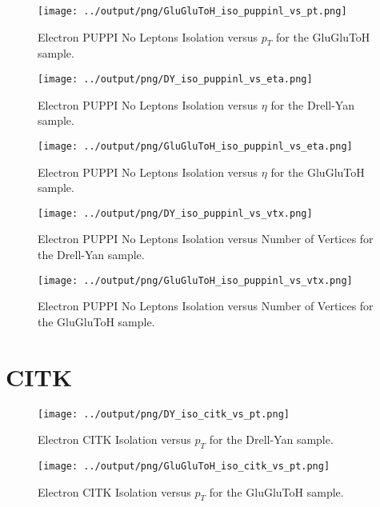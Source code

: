 \documentclass[11pt]{book}
\begin{document}
\begin{figure}[htb]
\centering
\texttt{[image: ../output/png/GluGluToH\_iso\_puppinl\_vs\_pt.png]}
\caption{Electron PUPPI No Leptons Isolation versus $p_{T}$ for the GluGluToH sample.}
\label{fig:ggh_iso_puppinl_vs_pt}
\end{figure}

\begin{figure}[htb]
\centering
\texttt{[image: ../output/png/DY\_iso\_puppinl\_vs\_eta.png]}
\caption{Electron PUPPI No Leptons Isolation versus $\eta$ for the Drell-Yan sample.}
\label{fig:dy_iso_puppinl_vs_eta}
\end{figure}

\begin{figure}[htb]
\centering
\texttt{[image: ../output/png/GluGluToH\_iso\_puppinl\_vs\_eta.png]}
\caption{Electron PUPPI No Leptons Isolation versus $\eta$ for the GluGluToH sample.}
\label{fig:ggh_iso_puppinl_vs_eta}
\end{figure}

\begin{figure}[htb]
\centering
\texttt{[image: ../output/png/DY\_iso\_puppinl\_vs\_vtx.png]}
\caption{Electron PUPPI No Leptons Isolation versus Number of Vertices for the Drell-Yan sample.}
\label{fig:dy_iso_puppinl_vs_vtx}
\end{figure}

\begin{figure}[htb]
\centering
\texttt{[image: ../output/png/GluGluToH\_iso\_puppinl\_vs\_vtx.png]}
\caption{Electron PUPPI No Leptons Isolation versus Number of Vertices for the GluGluToH sample.}
\label{fig:ggh_iso_puppinl_vs_vtx}
\end{figure}
\clearpage


\section{CITK}

\begin{figure}[htb]
\centering
\texttt{[image: ../output/png/DY\_iso\_citk\_vs\_pt.png]}
\caption{Electron CITK Isolation versus $p_{T}$ for the Drell-Yan sample.}
\label{fig:dy_iso_citk_vs_pt}
\end{figure}

\begin{figure}[htb]
\centering
\texttt{[image: ../output/png/GluGluToH\_iso\_citk\_vs\_pt.png]}
\caption{Electron CITK Isolation versus $p_{T}$ for the GluGluToH sample.}
\label{fig:ggh_iso_citk_vs_pt}
\end{figure}
\end{document}
